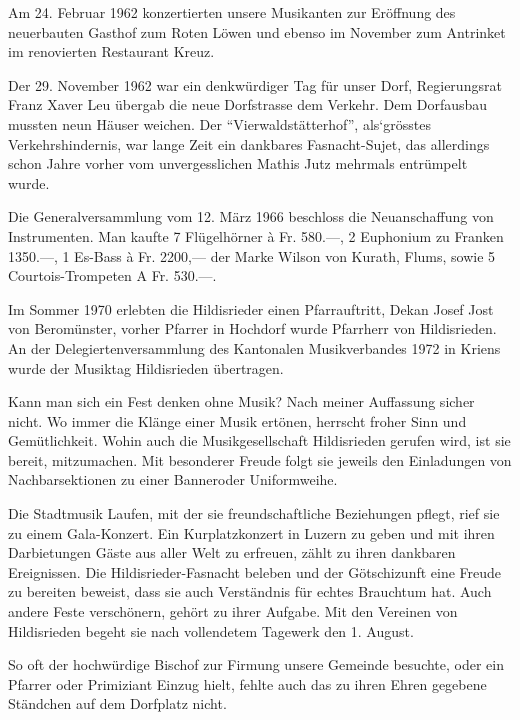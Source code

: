 \begin{history}
    Am 24. Februar 1962 konzertierten unsere Musikanten zur Eröffnung des
    neuerbauten Gasthof zum Roten Löwen und ebenso im November zum Antrinket im
    renovierten Restaurant Kreuz.

    Der 29. November 1962 war ein denkwürdiger Tag für unser Dorf, Regierungsrat
    Franz Xaver Leu übergab die neue Dorfstrasse dem Verkehr. Dem Dorfausbau
    mussten neun Häuser weichen. Der \enquote{Vierwaldstätterhof}, als`grösstes
    Verkehrshindernis, war lange Zeit ein dankbares Fasnacht-Sujet, das
    allerdings schon Jahre vorher vom unvergesslichen Mathis Jutz mehrmals
    entrümpelt wurde.

    Die Generalversammlung vom 12. März 1966 beschloss die Neuanschaffung von
    Instrumenten. Man kaufte 7 Flügelhörner à Fr. 580.—, 2 Euphonium zu Franken
    1350.—, 1 Es-Bass à Fr. 2200,— der Marke Wilson von Kurath, Flums, sowie 5
    Courtois-Trompeten A Fr. 530.—.

    Im Sommer 1970 erlebten die Hildisrieder einen Pfarrauftritt, Dekan Josef
    Jost von Beromünster, vorher Pfarrer in Hochdorf wurde Pfarrherr von
    Hildisrieden. An der Delegiertenversammlung des Kantonalen Musikverbandes
    1972 in Kriens wurde der Musiktag Hildisrieden übertragen.

    Kann man sich ein Fest denken ohne Musik? Nach meiner Auffassung sicher
    nicht. Wo immer die Klänge einer Musik ertönen, herrscht froher Sinn und
    Gemütlichkeit. Wohin auch die Musikgesellschaft Hildisrieden gerufen wird,
    ist sie bereit, mitzumachen. Mit besonderer Freude folgt sie jeweils den
    Einladungen von Nachbarsektionen zu einer Banneroder Uniformweihe.

    Die Stadtmusik Laufen, mit der sie freundschaftliche Beziehungen pflegt,
    rief sie zu einem Gala-Konzert. Ein Kurplatzkonzert in Luzern zu geben und
    mit ihren Darbietungen Gäste aus aller Welt zu erfreuen, zählt zu ihren
    dankbaren Ereignissen. Die Hildisrieder-Fasnacht beleben und der
    Götschizunft eine Freude zu bereiten beweist, dass sie auch Verständnis für
    echtes Brauchtum hat. Auch andere Feste verschönern, gehört zu ihrer
    Aufgabe. Mit den Vereinen von Hildisrieden begeht sie nach vollendetem
    Tagewerk den 1. August.

    So oft der hochwürdige Bischof zur Firmung unsere Gemeinde besuchte, oder
    ein Pfarrer oder Primiziant Einzug hielt, fehlte auch das zu ihren Ehren
    gegebene Ständchen auf dem Dorfplatz nicht.


\end{history}
